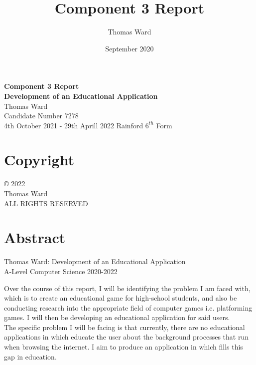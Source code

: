 \documentclass[12pt]{report}
\title{Component 3 Report}
\author{Thomas Ward}
\date{September 2020}
\begin{document}
\begin{titlepage} %
	\centering %
	{\Huge \textbf{Component 3 Report}}\\[\baselineskip] %
	{\Large \textbf{Development of an Educational Application}}\\ %
	\vfill %
	{\Large Thomas Ward\\ Candidate Number 7278}\\
	\vfill
	{\large 4th October 2021 - 29th Aprill 2022}%
	\vfill %
	Rainford $6^{th}$ Form
\end{titlepage}

\pagebreak

\setcounter{page}{2}

\setcounter{secnumdepth}{0}

\thispagestyle{plain}

\chapter*{Copyright}
\vfill
\begin{center}
© 2022\\
Thomas Ward\\
ALL RIGHTS RESERVED
\end{center}
\vfill

\chapter*{Abstract}
\begin{center}
Thomas Ward: Development of an Educational Application\\
A-Level Computer Science 2020-2022\\
\end{center}

Over the course of this report, I will be identifying the problem I am faced with, which is to create an educational game for high-school students, and also be conducting research into the appropriate field of computer games i.e. platforming games. I will then be developing an educational application for said users.\\

The specific problem I will be facing is that currently, there are no educational applications in which educate the user about the background processes that run when browsing the internet. I aim to produce an application in which fills this gap in education.\\
\end{document}
